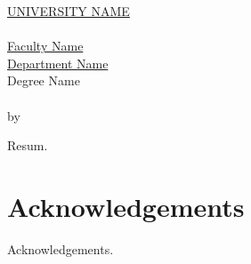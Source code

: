 \clearpage
\thispagestyle{plain}
\null\vfill
\begin{otherlanguage}{catalan}
  \begin{center}
    \makeatletter
    \MakeUppercase{\href{https://href.com}{University Name}} \\
    \vspace{20pt}
    {\huge \textit{\abstractname}} \\
    \bigskip
    \href{https://href.com}{Faculty Name} \\
    \href{https://href.com}{Department Name} \\
    \bigskip
    Degree Name \\
    \bigskip
    \textbf{\@title} \\
    \medskip
    by \@author \\
    \bigskip
    \makeatother
  \end{center}
  Resum.
\end{otherlanguage}
\vfill\null


\chapter*{Acknowledgements}

Acknowledgements.


\tableofcontents
{\listoffigures \let\cleardoublepage\clearpage \listoftables}
